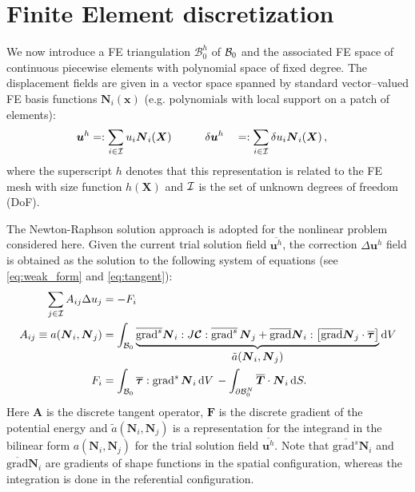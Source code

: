 \documentclass[times,doublespace]{nmeauth}
\def\gz  #1{           \mbox{$\boldsymbol{#1}$}}
\def\grad {\mbox{grad}}
\def\d {\mbox{d}}
\def\mcl  #1{               {\cal #1}}
\begin{document}
\section{Finite Element discretization}
\label{sec:fe}

We now introduce a FE triangulation $\mathcal{B}^h_0$ of $\mcl B_0$ and
the associated FE space of continuous piecewise elements with polynomial space of fixed degree. %
The displacement fields are given in
a vector space spanned by standard vector--valued FE basis functions $\gz N_i(\gz x)$ (e.g. polynomials with local support on a patch of elements):
\begin{alignat}{2}
       \gz u^h &=:  \sum_{i \in \mcl I} u_i \gz N_i (\gz X) \quad \quad \quad
\delta \gz u^h &&=: \sum_{i \in \mcl I} \delta u_i \gz N_i (\gz X) \,,
\end{alignat}
where the superscript $h$ denotes that this representation is related to the FE mesh with size function $h(\gz X)$ and $\mcl I$ is the set of unknown degrees of freedom (DoF).

The Newton-Raphson solution approach is adopted for the nonlinear problem considered here.
Given the current trial solution field $\overline{\gz u^h}$, the correction $\Delta \gz u^h$ field is obtained as the solution to the following system of equations (see \eqref{eq:weak_form} and \eqref{eq:tangent}):
\begin{align}
  \sum_{j \in \mcl I} A_{ij} \Delta u_j &= - F_i  \label{eq:linear_system} \\
  A_{ij} \equiv a(\gz N_i, \gz N_j) &=
  \int_{\mcl B_0}
  \underbrace{
  \overline{\grad^s} \gz N_i : J \boldsymbol{\mathcal{C}} : \overline{\grad^s} \, \gz N_j
  +
  \overline{\grad}\gz N_i :
  \left[
  \overline{\grad} \gz N_j \cdot
  \overline{\gz \tau}
  \right]
  }_{\displaystyle \tilde{a}(\gz N_i, \gz N_j)}
  \d V
  \label{eq:algebraic_tangent}
  \\
  F_i &=
  \int_{\mcl B_0} \overline{\gz \tau} : \grad^{s} \, \gz N_i \, \d V \,
  -
  \int_{\partial \mcl B_0^N} \overline{\gz T} \cdot \gz N_i \, \d S.
\end{align}
Here $\gz A$ is the discrete tangent {\color{red}operator}, $\gz F$ is the discrete gradient {\color{red}of the potential energy}
and $\tilde{a}(\gz N_i, \gz N_j)$ is a representation for the integrand in the bilinear form $a(\gz N_i, \gz N_j)$ for the trial solution field $\overline{\gz u^h}$.
Note that $\overline{\grad^s} \gz N_i$ and $\overline{\grad} \gz N_i$ are gradients of shape functions in the {\color{red}spatial} configuration, whereas the integration is done in the {\color{red}referential} configuration.
\end{document}
